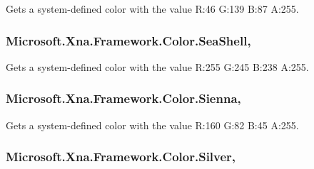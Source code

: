 Gets a system-\/defined color with the value R\+:46 G\+:139 B\+:87 A\+:255.

\hypertarget{struct_microsoft_1_1_xna_1_1_framework_1_1_color_ad0d01823444688111465982240865d9a}{}
\subsubsection[{Sea\+Shell}]{ Microsoft.\+Xna.\+Framework.\+Color.\+Sea\+Shell\hspace{0.3cm}{\ttfamily [static]}, {\ttfamily [get]}}\label{struct_microsoft_1_1_xna_1_1_framework_1_1_color_ad0d01823444688111465982240865d9a}


Gets a system-\/defined color with the value R\+:255 G\+:245 B\+:238 A\+:255.

\hypertarget{struct_microsoft_1_1_xna_1_1_framework_1_1_color_af68862f3f98b7f3a1693d2b0781ccdfd}{}
\subsubsection[{Sienna}]{ Microsoft.\+Xna.\+Framework.\+Color.\+Sienna\hspace{0.3cm}{\ttfamily [static]}, {\ttfamily [get]}}\label{struct_microsoft_1_1_xna_1_1_framework_1_1_color_af68862f3f98b7f3a1693d2b0781ccdfd}


Gets a system-\/defined color with the value R\+:160 G\+:82 B\+:45 A\+:255.

\hypertarget{struct_microsoft_1_1_xna_1_1_framework_1_1_color_afac2e7cf466baf798c7edc2613462871}{}
\subsubsection[{Silver}]{ Microsoft.\+Xna.\+Framework.\+Color.\+Silver\hspace{0.3cm}{\ttfamily [static]}, {\ttfamily [get]}}\label{struct_microsoft_1_1_xna_1_1_framework_1_1_color_afac2e7cf466baf798c7edc2613462871}


